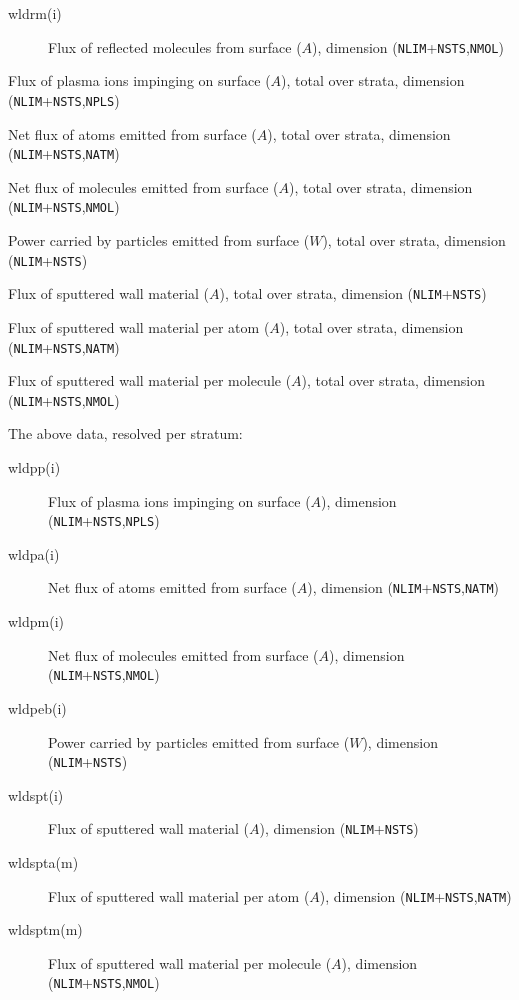 \documentclass[a4paper,10pt]{report}
\begin{document}
\begin{description}
\begin{description}
    \item[wldrm(i)] Flux of reflected molecules from surface ($A$), dimension ({\tt NLIM}+{\tt NSTS},{\tt NMOL})
  \end{description}
  \item[wldpp] Flux of plasma ions impinging on surface ($A$), total over strata, dimension ({\tt NLIM}+{\tt NSTS},{\tt NPLS})
  \item[wldpa] Net flux of atoms emitted from surface ($A$), total over strata, dimension ({\tt NLIM}+{\tt NSTS},{\tt NATM})
  \item[wldpm] Net flux of molecules emitted from surface ($A$), total over strata, dimension ({\tt NLIM}+{\tt NSTS},{\tt NMOL})
  \item[wldpeb] Power carried by particles emitted from surface ($W$), total over strata, dimension ({\tt NLIM}+{\tt NSTS})
  \item[wldspt] Flux of sputtered wall material ($A$), total over strata, dimension ({\tt NLIM}+{\tt NSTS})
  \item[wldspta] Flux of sputtered wall material per atom ($A$), total over strata, dimension ({\tt NLIM}+{\tt NSTS},{\tt NATM})
  \item[wldsptm] Flux of sputtered wall material per molecule ($A$), total over strata, dimension ({\tt NLIM}+{\tt NSTS},{\tt NMOL})
  \item[For each stratum $i=1,nstra$] The above data, resolved per stratum:
  \begin{description}
    \item[wldpp(i)] Flux of plasma ions impinging on surface ($A$), dimension ({\tt NLIM}+{\tt NSTS},{\tt NPLS})
    \item[wldpa(i)] Net flux of atoms emitted from surface ($A$), dimension ({\tt NLIM}+{\tt NSTS},{\tt NATM})
    \item[wldpm(i)] Net flux of molecules emitted from surface ($A$), dimension ({\tt NLIM}+{\tt NSTS},{\tt NMOL})
    \item[wldpeb(i)] Power carried by particles emitted from surface ($W$), dimension ({\tt NLIM}+{\tt NSTS})
    \item[wldspt(i)] Flux of sputtered wall material ($A$), dimension ({\tt NLIM}+{\tt NSTS})
  \item[wldspta(m)] Flux of sputtered wall material per atom ($A$), dimension ({\tt NLIM}+{\tt NSTS},{\tt NATM})
  \item[wldsptm(m)] Flux of sputtered wall material per molecule ($A$), dimension ({\tt NLIM}+{\tt NSTS},{\tt NMOL})
  \end{description}

\end{description}
\end{document}
